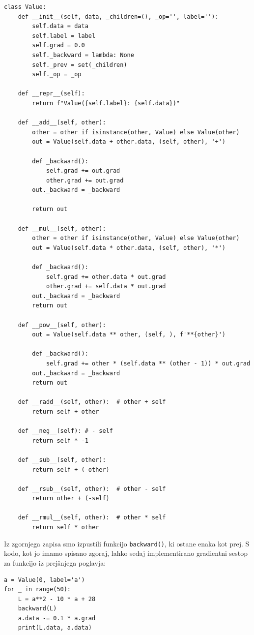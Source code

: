 \vspace*{3mm}
\begin{lstlisting}
class Value:
    def __init__(self, data, _children=(), _op='', label=''):
        self.data = data
        self.label = label
        self.grad = 0.0
        self._backward = lambda: None
        self._prev = set(_children)
        self._op = _op

    def __repr__(self):
        return f"Value({self.label}: {self.data})"
    
    def __add__(self, other):
        other = other if isinstance(other, Value) else Value(other)
        out = Value(self.data + other.data, (self, other), '+')

        def _backward():
            self.grad += out.grad
            other.grad += out.grad
        out._backward = _backward

        return out
    
    def __mul__(self, other):
        other = other if isinstance(other, Value) else Value(other)
        out = Value(self.data * other.data, (self, other), '*')

        def _backward():
            self.grad += other.data * out.grad
            other.grad += self.data * out.grad
        out._backward = _backward
        return out
    
    def __pow__(self, other):
        out = Value(self.data ** other, (self, ), f'**{other}')

        def _backward():
            self.grad += other * (self.data ** (other - 1)) * out.grad
        out._backward = _backward
        return out
    
    def __radd__(self, other):  # other + self
        return self + other
    
    def __neg__(self): # - self
        return self * -1
    
    def __sub__(self, other):
        return self + (-other)
    
    def __rsub__(self, other):  # other - self
        return other + (-self)

    def __rmul__(self, other):  # other * self
        return self * other
\end{lstlisting}

Iz zgornjega zapisa smo izpustili funkcijo \texttt{backward()}, ki ostane enaka kot prej. S kodo, kot jo imamo spisano zgoraj, lahko sedaj implementirano gradientni sestop za funkcijo iz prejšnjega poglavja:

\vspace*{3mm}
\begin{lstlisting}
a = Value(0, label='a')
for _ in range(50):
    L = a**2 - 10 * a + 28
    backward(L)
    a.data -= 0.1 * a.grad
    print(L.data, a.data)
\end{lstlisting}

